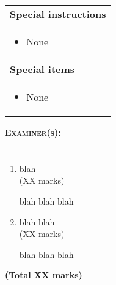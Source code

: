 \documentclass[12pt, a4paper]{exam}
\begin{document}
\begin{titlepage}
\begin{table}[H]
\begin{tabular}{p{14cm}}
{\bf{Special instructions}}\\

    \begin{itemize}
      \item None
    \end{itemize} \\


{\bf{Special items}}\\ 

    \begin{itemize}
      \item None
    \end{itemize} \\


\end{tabular}
\end{table}

\textsc{\Large {\bf{Examiner(s):}} }

\end{titlepage}

\section{}
\begin{enumerate}

\item blah\\
\hspace*{\fill} (XX marks)
\begin{solution}blah blah blah\end{solution}

\item blah blah\\
\hspace*{\fill} (XX marks)
\begin{solution}blah blah blah\end{solution}

\end{enumerate}
\hspace*{\fill} {\bf{(Total XX marks)}}
\end{document}
